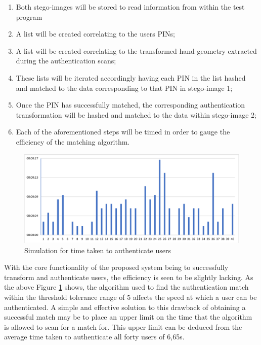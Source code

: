 \begin{enumerate}[label=\roman*.]
    \item Both stego-images will be stored to read information from within the test program
    \item A list will be created correlating to the users PINs;
    \item A list will be created correlating to the transformed hand geometry extracted during the authentication scans;
    \item These lists will be iterated accordingly having each PIN in the list hashed and matched to the data corresponding to that PIN in stego-image 1;
    \item Once the PIN has successfully matched, the corresponding authentication transformation will be hashed and matched to the data within stego-image 2;
    \item Each of the aforementioned steps will be timed in order to gauge the efficiency of the matching algorithm.
    
\end{enumerate}

    
    \begin{figure}[htbp!] 
    \centering    
    \includegraphics[width=1.0\textwidth]{Chapter4/Figs/AuthTest1.png}
    \caption[Simulation for time taken to authenticate users]{Simulation for time taken to authenticate users}
    \label{fig:Simulation for time taken to authenticate users}
    \end{figure}
    
With the core functionality of the proposed system being to successfully transform and authenticate users, the efficiency is seen to be slightly lacking. As the above Figure \ref{fig:Simulation for time taken to authenticate users} shows, the algorithm used to find the authentication match within the threshold tolerance range of 5 affects the speed at which a user can be authenticated. A simple and effective solution to this drawback of obtaining a successful match may be to place an upper limit on the time that the algorithm is allowed to scan for a match for. This upper limit can be deduced from the average time taken to authenticate all forty users of 6,65s. 

